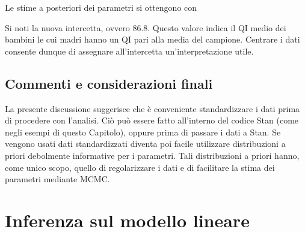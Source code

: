 \documentclass[
  11pt,
]{krantz}
\makeatletter
\newenvironment{Shaded}{\begin{snugshade}}{\end{snugshade}}
\newcommand{\CommentTok}[1]{\textcolor[rgb]{0.37,0.37,0.37}{\textit{#1}}}
\newcommand{\FunctionTok}[1]{\textcolor[rgb]{0,0,0}{#1}}
\newcommand{\NormalTok}[1]{#1}
\newcommand{\SpecialCharTok}[1]{\textcolor[rgb]{0,0,0}{#1}}
\newcommand{\StringTok}[1]{\textcolor[rgb]{0.5,0.5,0.5}{#1}}
\newenvironment{kframe}{%
\medskip{}
\setlength{\fboxsep}{.8em}
 \def\at@end@of@kframe{}%
 \ifinner\ifhmode%
  \def\at@end@of@kframe{\end{minipage}}%
  \begin{minipage}{\columnwidth}%
 \fi\fi%
 \def\FrameCommand##1{\hskip\@totalleftmargin \hskip-\fboxsep
 \colorbox{shadecolor}{##1}\hskip-\fboxsep
     \hskip-\linewidth \hskip-\@totalleftmargin \hskip\columnwidth}%
 \MakeFramed {\advance\hsize-\width
   \@totalleftmargin\z@ \linewidth\hsize
   \@setminipage}}%
 {\par\unskip\endMakeFramed%
 \at@end@of@kframe}
\renewenvironment{Shaded}{\begin{kframe}}{\end{kframe}}
\theoremstyle{definition}
\theoremstyle{definition}
\theoremstyle{definition}
\theoremstyle{definition}
\theoremstyle{remark}
\makeatother
\begin{document}
Le stime a posteriori dei parametri si ottengono con

\begin{Shaded}
\end{Shaded}

Si noti la nuova intercetta, ovvero 86.8. Questo valore indica il QI medio dei bambini le cui madri hanno un QI pari alla media del campione. Centrare i dati consente dunque di assegnare all'intercetta un'interpretazione utile.

\hypertarget{commenti-e-considerazioni-finali-1}{%
\section*{Commenti e considerazioni finali}\label{commenti-e-considerazioni-finali-1}}


La presente discussione suggerisce che è conveniente standardizzare i dati prima di procedere con l'analisi. Ciò può essere fatto all'interno del codice Stan (come negli esempi di questo Capitolo), oppure prima di passare i dati a Stan. Se vengono usati dati standardizzati diventa poi facile utilizzare distribuzioni a priori debolmente informative per i parametri. Tali distribuzioni a priori hanno, come unico scopo, quello di regolarizzare i dati e di facilitare la stima dei parametri mediante MCMC.

\hypertarget{inference-reg-lin-stan}{%
\chapter{Inferenza sul modello lineare}\label{inference-reg-lin-stan}}
\end{document}
